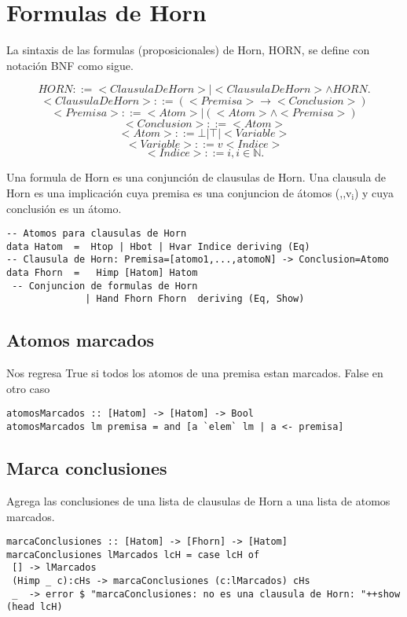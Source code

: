\documentclass[11pt]{article}
\begin{document}
\section{Formulas de Horn}
\label{sec:org6b1790e}
La sintaxis de las formulas (proposicionales) de Horn, HORN, se define con notación BNF como sigue.

\[HORN                ::= <ClausulaDeHorn> | <ClausulaDeHorn> \land HORN.\]
\[<ClausulaDeHorn>    ::= (<Premisa> \rightarrow <Conclusion>)\]
\[<Premisa>           ::= <Atom> | (<Atom> \land <Premisa>)\]
\[<Conclusion>        ::= <Atom>\]
\[<Atom>              ::= \bot | \top | <Variable>\]
\[<Variable>          ::= v <Indice>\]
\[<Indice>            ::= i, i \in \mathbb{N}.\]

Una formula de Horn es una conjunción de clausulas de Horn.
Una clausula de Horn es una implicación cuya premisa es una conjuncion de 
átomos (\bot,\top,v\(_{\text{i}}\)) y cuya conclusión es un átomo.

\begin{verbatim}
-- Atomos para clausulas de Horn
data Hatom  =  Htop | Hbot | Hvar Indice deriving (Eq) 
-- Clausula de Horn: Premisa=[atomo1,...,atomoN] -> Conclusion=Atomo
data Fhorn  =   Himp [Hatom] Hatom                     
 -- Conjuncion de formulas de Horn 
              | Hand Fhorn Fhorn  deriving (Eq, Show)  
\end{verbatim}
\subsection{Atomos marcados}
\label{sec:org5897fbc}
Nos regresa True si todos los atomos de una premisa estan marcados. False en otro caso
\begin{verbatim}
atomosMarcados :: [Hatom] -> [Hatom] -> Bool
atomosMarcados lm premisa = and [a `elem` lm | a <- premisa] 
\end{verbatim}
\subsection{Marca conclusiones}
\label{sec:org11cfc9f}
Agrega las conclusiones de una lista de clausulas de Horn a una lista de atomos marcados.
\begin{verbatim}
marcaConclusiones :: [Hatom] -> [Fhorn] -> [Hatom]
marcaConclusiones lMarcados lcH = case lcH of
 [] -> lMarcados
 (Himp _ c):cHs -> marcaConclusiones (c:lMarcados) cHs
 _  -> error $ "marcaConclusiones: no es una clausula de Horn: "++show (head lcH)
\end{verbatim}
\end{document}
